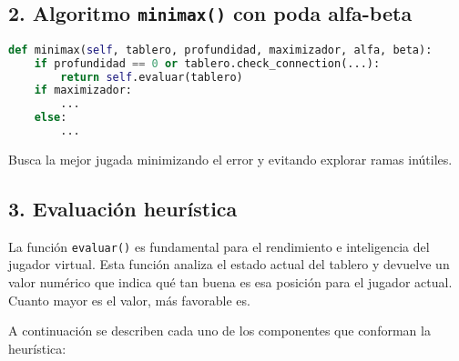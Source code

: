 \documentclass[12pt]{article}
\begin{document}
\subsection{2. Algoritmo \texttt{minimax()} con poda alfa-beta}

\begin{lstlisting}[language=Python]
def minimax(self, tablero, profundidad, maximizador, alfa, beta):
    if profundidad == 0 or tablero.check_connection(...):
        return self.evaluar(tablero)
    if maximizador:
        ...
    else:
        ...
\end{lstlisting}

Busca la mejor jugada minimizando el error y evitando explorar ramas inútiles.

\subsection{3. Evaluación heurística}

La función \texttt{evaluar()} es fundamental para el rendimiento e inteligencia del jugador virtual. Esta función analiza el estado actual del tablero y devuelve un valor numérico que indica qué tan buena es esa posición para el jugador actual. Cuanto mayor es el valor, más favorable es.

A continuación se describen cada uno de los componentes que conforman la heurística:
\end{document}
